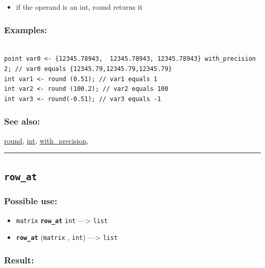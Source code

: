 \documentclass[]{book}
\providecommand{\tightlist}{%
  \setlength{\itemsep}{0pt}\setlength{\parskip}{0pt}}
\theoremstyle{definition}
\theoremstyle{definition}
\theoremstyle{definition}
\theoremstyle{remark}
\begin{document}
\begin{itemize}
\tightlist
\item
  if the operand is an int, round returns it
\end{itemize}

\subsubsection{Examples:}\label{examples-306}

\begin{verbatim}
 
point var0 <- {12345.78943,  12345.78943, 12345.78943} with_precision 2; // var0 equals {12345.79,12345.79,12345.79} 
int var1 <- round (0.51); // var1 equals 1 
int var2 <- round (100.2); // var2 equals 100 
int var3 <- round(-0.51); // var3 equals -1
\end{verbatim}

\subsubsection{See also:}\label{see-also-180}

\href{operators-n-to-r.html\#round}{round},
\href{operators-i-to-m.html\#int}{int},
\href{operators-s-to-z.html\#with_precision}{with\_precision},

\begin{center}\rule{0.5\linewidth}{\linethickness}\end{center}

\subsection{\texorpdfstring{\texttt{row\_at}}{row\_at}}\label{row_at}

\subsubsection{Possible use:}\label{possible-use-446}

\begin{itemize}
\tightlist
\item
  \texttt{matrix} \textbf{\texttt{row\_at}} \texttt{int}
  ---\textgreater{} \texttt{list}
\item
  \textbf{\texttt{row\_at}} (\texttt{matrix} , \texttt{int})
  ---\textgreater{} \texttt{list}
\end{itemize}

\subsubsection{Result:}\label{result-432}
\end{document}

